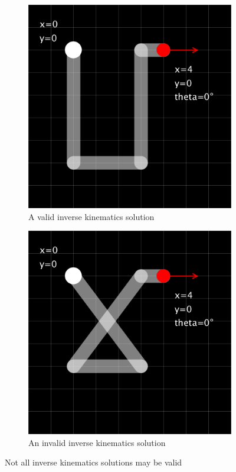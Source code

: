 \begin{figure}[h]
    \centering
    \begin{subfigure}[t]{0.45\textwidth}
        \includegraphics[width=\textwidth]{figures/ik-valid.png}
        \caption{A valid inverse kinematics solution}
        \label{fig:ik-valid}
    \end{subfigure}
    \hfill
    \begin{subfigure}[t]{0.45\textwidth}
        \includegraphics[width=\textwidth]{figures/ik-invalid.png}
        \caption{An invalid inverse kinematics solution}
        \label{fig:ik-invalid}
    \end{subfigure}
    \caption{Not all inverse kinematics solutions may be valid}
    \label{fig:ik-null-space}
\end{figure}

